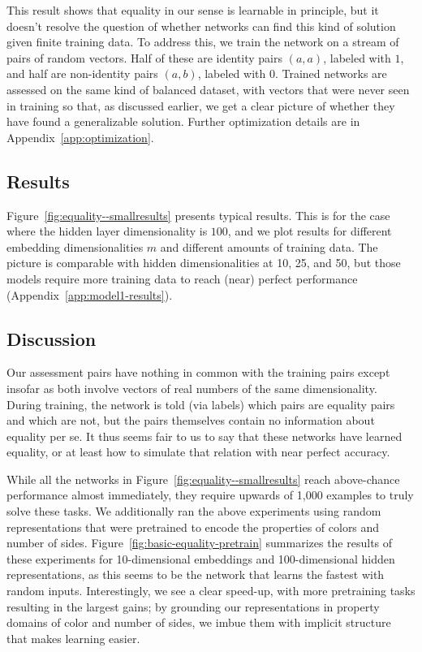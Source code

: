 \documentclass{article}
\newcommand{\Figref}[1]{Figure~\ref{#1}}
\newcommand{\figref}[1]{Figure~\ref{#1}}
\newcommand{\appref}[1]{Appendix~\ref{#1}}
\newcommand{\update}[1]{{\color{darkblue}#1}}
\newcommand{\updatea}[1]{{\color{darkred}#1}}
\begin{document}
This result shows that equality in our sense is learnable in principle, but it doesn't resolve the question of whether networks can find this kind of solution given finite training data. To address this, we train the network on a stream of pairs of random vectors. Half of these are identity pairs $(a, a)$, labeled with $1$, and half are non-identity pairs $(a, b)$, labeled with $0$. Trained networks are assessed on the same kind of balanced dataset, with vectors that were never seen in training so that, as discussed earlier, we get a clear picture of whether they have found a generalizable solution.  Further optimization details are in \appref{app:optimization}.


\subsection{Results}

\Figref{fig:equality--smallresults} presents typical results. This is for the case where the hidden layer dimensionality is $100$, and we plot results for different embedding dimensionalities $m$ and different amounts of training data. The picture is comparable with hidden dimensionalities at 10, 25, and 50, but those models require more training data to reach (near) perfect performance (\appref{app:model1-results}).


\subsection{Discussion}

Our assessment pairs have nothing in common with the training pairs except insofar as both involve vectors of real numbers of the same dimensionality. During training, the network is told (via labels) which pairs are equality pairs and which are not, but the pairs themselves contain no information about equality per se. It thus seems fair to us to say that these networks have learned equality, or at least how to simulate that relation with near perfect accuracy.

\update{
  While all the networks in \figref{fig:equality--smallresults} reach above-chance performance almost immediately, they require upwards of 1,000 examples to truly solve these tasks. \updatea{We additionally ran the above experiments using random representations that were pretrained to encode the properties of colors and number of sides. \Figref{fig:basic-equality-pretrain} summarizes the results of these experiments for 10-dimensional embeddings and 100-dimensional hidden representations, as this seems to be the network that learns the fastest with random inputs. Interestingly, we see a clear speed-up, with more pretraining tasks resulting in the largest gains; by grounding our representations in property domains of color and number of sides, we imbue them with implicit structure that makes learning easier.}}
\end{document}

